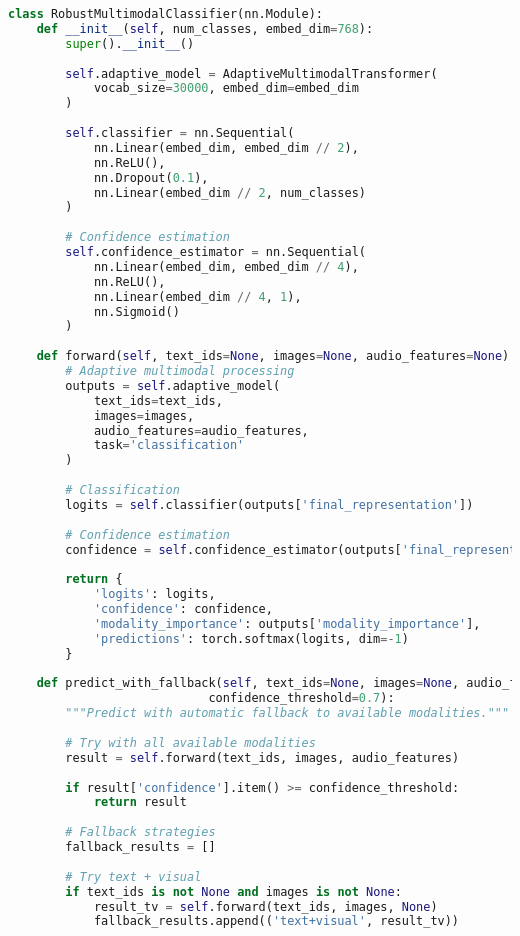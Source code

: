 \begin{lstlisting}[language=Python, caption=Robust classification with modality switching]
class RobustMultimodalClassifier(nn.Module):
    def __init__(self, num_classes, embed_dim=768):
        super().__init__()
        
        self.adaptive_model = AdaptiveMultimodalTransformer(
            vocab_size=30000, embed_dim=embed_dim
        )
        
        self.classifier = nn.Sequential(
            nn.Linear(embed_dim, embed_dim // 2),
            nn.ReLU(),
            nn.Dropout(0.1),
            nn.Linear(embed_dim // 2, num_classes)
        )
        
        # Confidence estimation
        self.confidence_estimator = nn.Sequential(
            nn.Linear(embed_dim, embed_dim // 4),
            nn.ReLU(),
            nn.Linear(embed_dim // 4, 1),
            nn.Sigmoid()
        )
    
    def forward(self, text_ids=None, images=None, audio_features=None):
        # Adaptive multimodal processing
        outputs = self.adaptive_model(
            text_ids=text_ids,
            images=images,
            audio_features=audio_features,
            task='classification'
        )
        
        # Classification
        logits = self.classifier(outputs['final_representation'])
        
        # Confidence estimation
        confidence = self.confidence_estimator(outputs['final_representation'])
        
        return {
            'logits': logits,
            'confidence': confidence,
            'modality_importance': outputs['modality_importance'],
            'predictions': torch.softmax(logits, dim=-1)
        }
    
    def predict_with_fallback(self, text_ids=None, images=None, audio_features=None, 
                            confidence_threshold=0.7):
        """Predict with automatic fallback to available modalities."""
        
        # Try with all available modalities
        result = self.forward(text_ids, images, audio_features)
        
        if result['confidence'].item() >= confidence_threshold:
            return result
        
        # Fallback strategies
        fallback_results = []
        
        # Try text + visual
        if text_ids is not None and images is not None:
            result_tv = self.forward(text_ids, images, None)
            fallback_results.append(('text+visual', result_tv))
        

\end{lstlisting}
